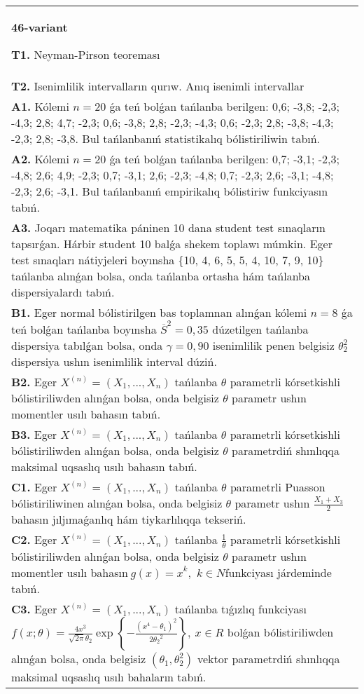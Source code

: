 \documentclass{article}
\begin{document}
\begin{tabular}{m{17cm}}
\textbf{46-variant}
\newline

\textbf{T1.} 
Neyman-Pirson teoreması
 \\
\textbf{T2.} 
Isenimlilik intervalların qurıw. Anıq isenimli intervallar
 \\
\textbf{A1.} 
Kólemi \(n = 20\) ǵa teń bolǵan tańlanba berilgen: 0,6; -3,8; -2,3; -4,3; 2,8; 4,7; -2,3; 0,6; -3,8; 2,8; -2,3; -4,3; 0,6; -2,3; 2,8; -3,8; -4,3; -2,3; 2,8; -3,8. Bul tańlanbanıń statistikalıq bólistiriliwin tabıń.
 \\
\textbf{A2.} 
Kólemi \(n = 20\) ǵa teń bolǵan tańlanba berilgen: 0,7; -3,1; -2,3; -4,8; 2,6; 4,9; -2,3; 0,7; -3,1; 2,6; -2,3; -4,8; 0,7; -2,3; 2,6; -3,1; -4,8; -2,3; 2,6; -3,1. Bul tańlanbanıń empirikalıq bólistiriw funkciyasın tabıń.
 \\
\textbf{A3.} 
Joqarı matematika páninen 10 dana student test sınaqların tapsırǵan. Hárbir student 10 balǵa shekem toplawı múmkin. Eger test sınaqları nátiyjeleri boyınsha \{10, 4, 6, 5, 5, 4, 10, 7, 9, 10\} tańlanba alınǵan bolsa, onda tańlanba ortasha hám tańlanba dispersiyalardı tabıń.
 \\
\textbf{B1.} 
Eger normal bólistirilgen bas toplamnan alınǵan kólemi \(n = 8\) ǵa teń bolǵan tańlanba boyınsha \({\overline{S}}^{2} = 0,35\) dúzetilgen tańlanba dispersiya tabılǵan bolsa, onda \(\gamma = 0,90\) isenimlilik penen belgisiz \(\theta_{2}^{2}\) dispersiya ushın isenimlilik interval dúziń.
 \\
\textbf{B2.} 
Eger \(X^{(n)} = \left( X_{1},...,X_{n} \right)\) tańlanba \(\theta\) parametrli kórsetkishli bólistiriliwden alınǵan bolsa, onda belgisiz \(\theta\) parametr ushın momentler usılı bahasın tabıń.
 \\
\textbf{B3.} 
Eger \(X^{(n)} = \left( X_{1},...,X_{n} \right)\) tańlanba \(\theta\) parametrli kórsetkishli bólistiriliwden alınǵan bolsa, onda belgisiz \(\theta\) parametrdiń shınlıqqa maksimal uqsaslıq usılı bahasın tabıń.
 \\
\textbf{C1.} 
Eger \(X^{(n)} = \left( X_{1},...,X_{n} \right)\) tańlanba \(\theta\) parametrli Puasson bólistiriliwinen alınǵan bolsa, onda belgisiz \(\theta\) parametr ushın \(\frac{X_{1} + X_{3}}{2}\) bahasın jıljımaǵanlıq hám tiykarlılıqqa tekseriń.
 \\
\textbf{C2.} 
Eger \(X^{(n)} = \left( X_{1},...,X_{n} \right)\) tańlanba \(\frac{1}{\theta}\) parametrli kórsetkishli bólistiriliwden alınǵan bolsa, onda belgisiz \(\theta\) parametr ushın momentler usılı bahasın\({\ g(x) = x}^{k},\) \(k \in N\)funkciyası járdeminde tabıń.
 \\
\textbf{C3.} 
Eger \(X^{(n)} = \left( X_{1},...,X_{n} \right)\) tańlanba tıǵızlıq funkciyası
$f(x;\theta) = \frac{4x^{3}}{\sqrt{2\pi}\theta_{2}}\exp\left\{ - \frac{\left( x^{4} - \theta_{1} \right)^{2}}{2{\theta_{2}}^{2}} \right\},\ x \in R$
bolǵan bólistiriliwden alınǵan bolsa, onda belgisiz \(\left( \theta_{1},\theta_{2}^{2} \right)\) vektor parametrdiń shınlıqqa maksimal uqsaslıq usılı bahaların tabıń.
 \\

\end{tabular}
\vspace{1cm}
\end{document}
